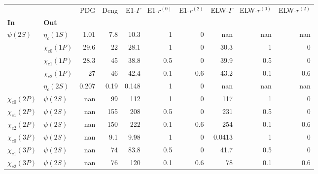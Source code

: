 \begin{tabular}{l|l|r|r|r|r|r|r|r|r}
\toprule
                &            &   PDG &  Deng &  E1-$\Gamma$ &  E1-$r^{(0)}$ &  E1-$r^{(2)}$ &  ELW-$\Gamma$ &  ELW-$r^{(0)}$ &  ELW-$r^{(2)}$ \\
\textbf{In} & \textbf{Out} &       &       &              &               &               &               &                &                \\
\midrule
\textbf{$\psi(2S)$} & \textbf{$\eta_{c}(1S)$} &  1.01 &   7.8 &         10.3 &             1 &             0 &           nan &            nan &            nan \\
                & \textbf{$\chi_{c0}(1P)$} &  29.6 &    22 &         28.1 &             1 &             0 &          30.3 &              1 &              0 \\
                & \textbf{$\chi_{c1}(1P)$} &  28.3 &    45 &         38.8 &           0.5 &             0 &          39.9 &            0.5 &              0 \\
                & \textbf{$\chi_{c2}(1P)$} &    27 &    46 &         42.4 &           0.1 &           0.6 &          43.2 &            0.1 &            0.6 \\
                & \textbf{$\eta_{c}(2S)$} & 0.207 &  0.19 &        0.148 &             1 &             0 &           nan &            nan &            nan \\
\textbf{$\chi_{c0}(2P)$} & \textbf{$\psi(2S)$} &   nan &    99 &          112 &             1 &             0 &           117 &              1 &              0 \\
\textbf{$\chi_{c1}(2P)$} & \textbf{$\psi(2S)$} &   nan &   155 &          208 &           0.5 &             0 &           231 &            0.5 &              0 \\
\textbf{$\chi_{c2}(2P)$} & \textbf{$\psi(2S)$} &   nan &   150 &          222 &           0.1 &           0.6 &           254 &            0.1 &            0.6 \\
\textbf{$\chi_{c0}(3P)$} & \textbf{$\psi(2S)$} &   nan &   9.1 &         9.98 &             1 &             0 &        0.0413 &              1 &              0 \\
\textbf{$\chi_{c1}(3P)$} & \textbf{$\psi(2S)$} &   nan &    74 &         83.8 &           0.5 &             0 &          41.7 &            0.5 &              0 \\
\textbf{$\chi_{c2}(3P)$} & \textbf{$\psi(2S)$} &   nan &    76 &          120 &           0.1 &           0.6 &            78 &            0.1 &            0.6 \\
\bottomrule
\end{tabular}
